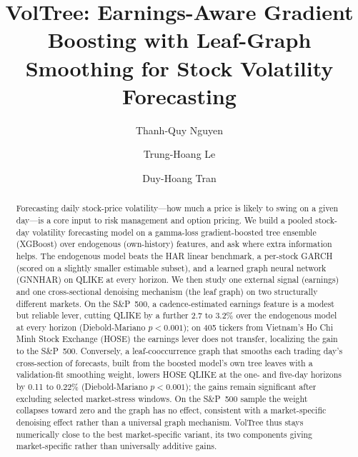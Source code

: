 \documentclass[runningheads,a4paper]{llncs}
\begin{document}
\title{VolTree: Earnings-Aware Gradient Boosting with Leaf-Graph Smoothing for Stock Volatility Forecasting}

\author{Thanh-Quy Nguyen \and Trung-Hoang Le \and Duy-Hoang Tran}

\maketitle
\pagestyle{empty}\thispagestyle{empty}   %

\begin{abstract}
Forecasting daily stock-price volatility---how much a price is likely to swing on a given day---is a core
input to risk management and option pricing. We build a pooled stock-day volatility forecasting model on a
gamma-loss gradient-boosted tree ensemble (XGBoost) over endogenous (own-history) features, and ask where
extra information helps. The endogenous model beats the HAR linear benchmark, a per-stock GARCH (scored on
a slightly smaller estimable subset), and a learned graph neural network (GNNHAR) on QLIKE at every
horizon. We then study one external signal (earnings) and one cross-sectional denoising mechanism (the leaf
graph) on two structurally different markets. On the S\&P~500, a cadence-estimated earnings feature is a
modest but reliable lever,
cutting QLIKE by a further 2.7 to 3.2\% over the endogenous model at every horizon (Diebold-Mariano
$p<0.001$); on 405 tickers from Vietnam's Ho Chi Minh Stock Exchange (HOSE) the earnings lever does not
transfer, localizing the gain to the S\&P~500. Conversely, a leaf-cooccurrence graph that smooths each trading day's
cross-section of forecasts, built from the boosted model's own tree leaves with a validation-fit smoothing
weight, lowers HOSE QLIKE at the one- and five-day horizons by 0.11 to 0.22\% (Diebold-Mariano $p<0.001$); the
gains remain significant after excluding selected market-stress windows. On the S\&P~500 sample the weight
collapses toward zero and the graph has no effect, consistent with a market-specific denoising effect
rather than a universal graph mechanism. VolTree thus stays numerically close to the best market-specific
variant, its two components giving market-specific rather than universally additive gains.
\end{abstract}
\end{document}
